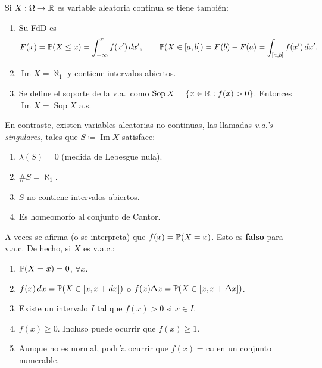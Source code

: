 \begin{corolario}[3]
Si $X : \Omega \to \mathbb{R}$ es variable aleatoria continua se tiene también:
\begin{enumerate}[label=(\alph*)]
  \item Su FdD es
        \[
          F(x) = \mathbb{P}(X \le x) = \int_{-\infty}^{x} f(x')\,dx', \qquad
          \mathbb{P}(X \in [a,b]) = F(b) - F(a) = \int_{[a,b]} f(x')\,dx'.
        \]
  \item $\operatorname{Im} X = \aleph_1$ y contiene intervalos abiertos.
  \item Se define el soporte de la v.a.\ como $\operatorname{Sop} X = \{x \in \mathbb{R} : f(x) > 0\}$. Entonces $\operatorname{Im} X = \operatorname{Sop} X$ a.s.
\end{enumerate}
\end{corolario}

\begin{observacion}[34]
En contraste, existen variables aleatorias no continuas, las llamadas \emph{v.a.'s singulares}, tales que $S \coloneqq \operatorname{Im} X$ satisface:
\begin{enumerate}[label=(\alph*)]
  \item $\lambda(S) = 0$ (medida de Lebesgue nula).
  \item $\#S = \aleph_1$.
  \item $S$ no contiene intervalos abiertos.
  \item Es homeomorfo al conjunto de Cantor.
\end{enumerate}
\end{observacion}

\begin{observacion}[35]
A veces se afirma (o se interpreta) que $f(x) = \mathbb{P}(X = x)$. Esto es \textbf{falso} para v.a.c. De hecho, si $X$ es v.a.c.:
\begin{enumerate}[label=(\alph*)]
  \item $\mathbb{P}(X = x) = 0$, $\forall x$.
  \item $f(x)\,dx = \mathbb{P}(X \in [x, x+dx])$ o $f(x)\Delta x = \mathbb{P}(X \in [x, x+\Delta x])$.
  \item Existe un intervalo $I$ tal que $f(x) > 0$ si $x \in I$.
  \item $f(x) \ge 0$. Incluso puede ocurrir que $f(x) \ge 1$.
  \item Aunque no es normal, podría ocurrir que $f(x) = \infty$ en un conjunto numerable.
\end{enumerate}
\end{observacion}

